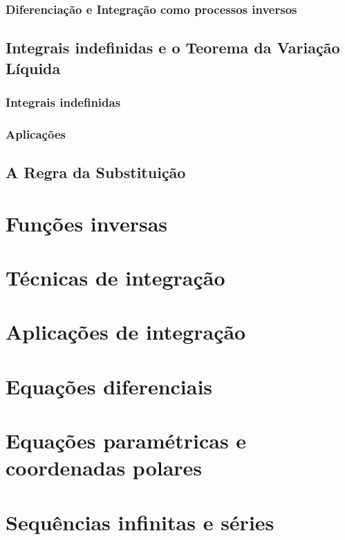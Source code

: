 \subsubsection{Diferenciação e Integração como processos inversos}
\subsection{Integrais indefinidas e o Teorema da Variação Líquida}
\subsubsection{Integrais indefinidas}
\subsubsection{Aplicações}
\subsection{A Regra da Substituição}


\section{Funções inversas}
\section{Técnicas de integração}
\section{Aplicações de integração}
\section{Equações diferenciais}
\section{Equações paramétricas e coordenadas polares}
\section{Sequências infinitas e séries}
